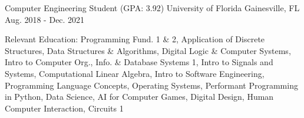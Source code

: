 \begin{cventries}
  \cventry
	{Computer Engineering Student (GPA: 3.92)}
	{University of Florida}
	{Gainesville, FL}
	{Aug. 2018 - Dec. 2021}
	{
		\begin{cvitems}
			\item {Relevant Education: Programming Fund. 1 \& 2, Application of Discrete Structures, Data Structures \& Algorithms, Digital Logic \& Computer Systems, Intro to Computer Org., Info. \& Database Systems 1, Intro to Signals and Systems, Computational Linear Algebra, Intro to Software Engineering, Programming Language Concepts, Operating Systems, Performant Programming in Python, Data Science, AI for Computer Games, Digital Design, Human Computer Interaction, Circuits 1}
		\end{cvitems}
	}
\end{cventries}
